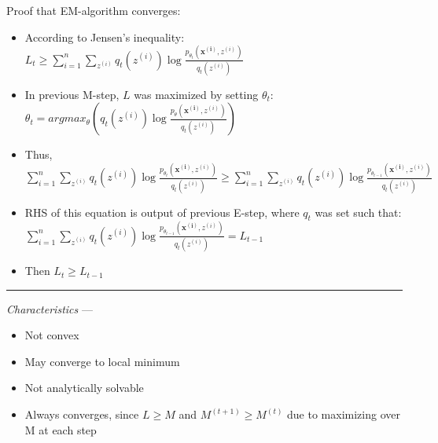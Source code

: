 Proof that EM-algorithm converges:
\begin{itemize}
    \item According to Jensen's inequality: $L_t \geq \sum_{i=1}^n \sum_{z^{(i)}} q_t(z^{(i)}) \log \frac{p_{\theta_t}( \boldsymbol{x^{(i)}}, z^{(i)})}{q_t(z^{(i)})}$
    \item In previous M-step, $L$ was maximized by setting $\theta_t$: $\theta_t = argmax_\theta (q_t(z^{(i)}) \log \frac{p_\theta( \boldsymbol{x^{(i)}}, z^{(i)})}{q_t(z^{(i)})})$
    \item Thus, $\sum_{i=1}^n \sum_{z^{(i)}} q_t(z^{(i)}) \log \frac{p_{\theta_t}( \boldsymbol{x^{(i)}}, z^{(i)})}{q_t(z^{(i)})} \geq \sum_{i=1}^n \sum_{z^{(i)}} q_t(z^{(i)}) \log \frac{p_{\theta_{t-1}}( \boldsymbol{x^{(i)}}, z^{(i)})}{q_t(z^{(i)})}$
    \item RHS of this equation is output of previous E-step, where $q_t$ was set such that: $\sum_{i=1}^n \sum_{z^{(i)}} q_t(z^{(i)}) \log \frac{p_{\theta_{t-1}}( \boldsymbol{x^{(i)}}, z^{(i)})}{q_t(z^{(i)})} = L_{t-1}$
    \item Then $L_t \geq L_{t-1}$
\end{itemize}

{\color{lightgray}\hrule height 0.001mm}

\emph{Characteristics} --- 
\begin{itemize}
    \item Not convex
    \item May converge to local minimum
    \item Not analytically solvable
    \item Always converges, since $L \geq M$ and $M^{(t+1)} \geq M^{(t)}$ due to maximizing over M at each step
\end{itemize}